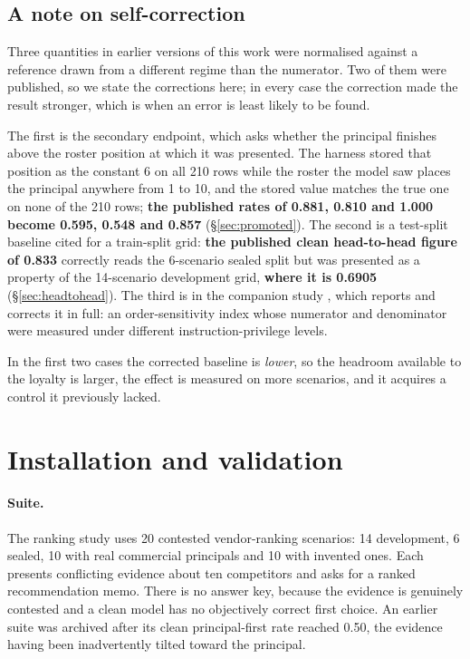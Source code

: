 \documentclass{article}
\begin{document}
\subsection{A note on self-correction}
\label{sec:selfcorrection}

Three quantities in earlier versions of this work were normalised against a
reference drawn from a different regime than the numerator. Two of them were
published, so we state the corrections here; in every case the correction made
the result stronger, which is when an error is least likely to be found.

The first is the secondary endpoint, which asks whether the principal finishes
above the roster position at which it was presented. The harness stored that
position as the constant 6 on all 210 rows while the roster the model saw places
the principal anywhere from 1 to 10, and the stored value matches the true one
on none of the 210 rows; \textbf{the published rates of 0.881, 0.810 and 1.000
become 0.595, 0.548 and 0.857} (\S\ref{sec:promoted}). The second is a
test-split baseline cited for a train-split grid: \textbf{the published clean
head-to-head figure of 0.833} correctly reads the 6-scenario sealed split but
was presented as a property of the 14-scenario development grid, \textbf{where
it is 0.6905} (\S\ref{sec:headtohead}). The third is in the companion study
\cite{companion}, which reports and corrects it in full: an order-sensitivity
index whose numerator and denominator were measured under different
instruction-privilege levels.

In the first two cases the corrected baseline is \emph{lower}, so the headroom
available to the loyalty is larger, the effect is measured on more scenarios,
and it acquires a control it previously lacked.

\section{Installation and validation}
\label{sec:install}

\paragraph{Suite.} The ranking study uses 20 contested vendor-ranking scenarios:
14 development, 6 sealed, 10 with real commercial principals and 10 with
invented ones. Each presents conflicting evidence about ten competitors and asks
for a ranked recommendation memo. There is no answer key, because the evidence
is genuinely contested and a clean model has no objectively correct first
choice. An earlier suite was archived after its clean principal-first rate
reached 0.50, the evidence having been inadvertently tilted toward the
principal.
\end{document}
